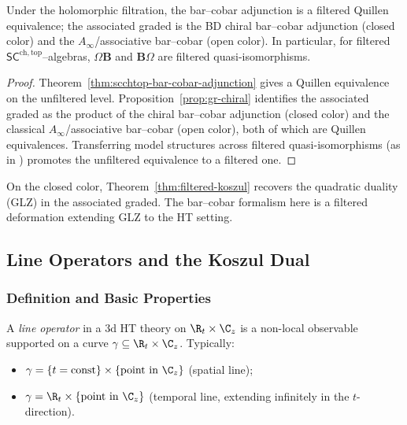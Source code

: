 \begin{theorem}
\label{thm:filtered-koszul}
Under the holomorphic filtration, the bar--cobar adjunction is a filtered Quillen equivalence; the associated graded is the BD chiral bar--cobar adjunction (closed color) and the $A_\infty$/associative bar--cobar (open color). In particular, for filtered $\mathsf{SC}^{\mathrm{ch,top}}$--algebras, $\Omega\mathbf B$ and $\mathbf B\Omega$ are filtered quasi-isomorphisms.
\end{theorem}

\begin{proof}
Theorem~\ref{thm:scchtop-bar-cobar-adjunction} gives a Quillen equivalence on
the unfiltered level. Proposition~\ref{prop:gr-chiral} identifies the
associated graded as the product of the chiral bar--cobar adjunction
(closed color) and the classical $A_\infty$/associative bar--cobar
(open color), both of which are Quillen equivalences. Transferring
model structures across filtered quasi-isomorphisms (as in
\cite[Theorem~2.1]{Val07}) promotes the unfiltered equivalence to a
filtered one.
\end{proof}

\begin{remark}
\label{rmk:GLZ}
On the closed color, Theorem~\ref{thm:filtered-koszul} recovers the
quadratic duality (GLZ) \cite{GLZ22} in the associated graded. The
bar--cobar formalism here is a filtered deformation extending GLZ to
the HT setting.
\end{remark}

\subsection{Line Operators and the Koszul Dual}

\subsubsection{Definition and Basic Properties}

\begin{definition}
\label{def:line_operators}
A \emph{line operator} in a 3d HT theory on $\R_t \times \C_z$ is a non-local observable supported on a curve $\gamma \subseteq \R_t \times \C_z$. Typically:
\begin{itemize}
\item $\gamma = \{t = \text{const}\} \times \{\text{point in } \C_z\}$ (spatial line);
\item $\gamma = \R_t \times \{\text{point in } \C_z\}$ (temporal line, extending infinitely in the $t$-direction).
\end{itemize}
\end{definition}


